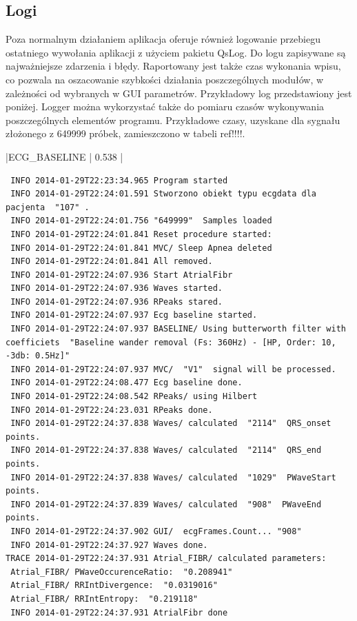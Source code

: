 \subsection{Logi}

Poza normalnym działaniem aplikacja oferuje również logowanie przebiegu ostatniego wywołania aplikacji z użyciem pakietu QsLog. Do logu zapisywane są najważniejsze zdarzenia i błędy. Raportowany jest także czas wykonania wpisu, co pozwala na oszacowanie szybkości działania poszczególnych modułów, w zależności od wybranych w GUI parametrów. Przykładowy log przedstawiony jest poniżej. Logger można wykorzystać także do pomiaru czasów wykonywania poszczególnych elementów programu. Przykładowe czasy, uzyskane dla sygnału złożonego z 649999 próbek, zamieszczono w tabeli ref!!!!.

\begin{table}
|ECG_BASELINE | 0.538 |
\end{table}

\begin{minipage}{\textwidth}
\begin{verbatim}
 INFO 2014-01-29T22:23:34.965 Program started 
 INFO 2014-01-29T22:24:01.591 Stworzono obiekt typu ecgdata dla pacjenta  "107" . 
 INFO 2014-01-29T22:24:01.756 "649999"  Samples loaded 
 INFO 2014-01-29T22:24:01.841 Reset procedure started: 
 INFO 2014-01-29T22:24:01.841 MVC/ Sleep Apnea deleted 
 INFO 2014-01-29T22:24:01.841 All removed. 
 INFO 2014-01-29T22:24:07.936 Start AtrialFibr 
 INFO 2014-01-29T22:24:07.936 Waves started. 
 INFO 2014-01-29T22:24:07.936 RPeaks stared. 
 INFO 2014-01-29T22:24:07.937 Ecg baseline started. 
 INFO 2014-01-29T22:24:07.937 BASELINE/ Using butterworth filter with coefficiets  "Baseline wander removal (Fs: 360Hz) - [HP, Order: 10, -3db: 0.5Hz]" 
 INFO 2014-01-29T22:24:07.937 MVC/  "V1"  signal will be processed. 
 INFO 2014-01-29T22:24:08.477 Ecg baseline done. 
 INFO 2014-01-29T22:24:08.542 RPeaks/ using Hilbert 
 INFO 2014-01-29T22:24:23.031 RPeaks done. 
 INFO 2014-01-29T22:24:37.838 Waves/ calculated  "2114"  QRS_onset points. 
 INFO 2014-01-29T22:24:37.838 Waves/ calculated  "2114"  QRS_end points. 
 INFO 2014-01-29T22:24:37.838 Waves/ calculated  "1029"  PWaveStart points. 
 INFO 2014-01-29T22:24:37.839 Waves/ calculated  "908"  PWaveEnd points. 
 INFO 2014-01-29T22:24:37.902 GUI/  ecgFrames.Count... "908" 
 INFO 2014-01-29T22:24:37.927 Waves done. 
TRACE 2014-01-29T22:24:37.931 Atrial_FIBR/ calculated parameters: 
 Atrial_FIBR/ PWaveOccurenceRatio:  "0.208941" 
 Atrial_FIBR/ RRIntDivergence:  "0.0319016" 
 Atrial_FIBR/ RRIntEntropy:  "0.219118" 
 INFO 2014-01-29T22:24:37.931 AtrialFibr done 
\end{verbatim}
\end{minipage}

